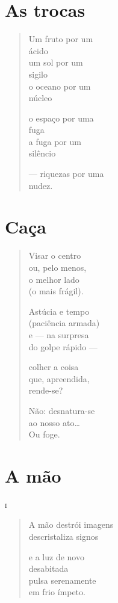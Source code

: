 \chapter{As trocas}

\begin{verse}
Um fruto por um\\
\qquad\qquad\qquad ácido\\
um sol por um\\
\qquad\qquad\qquad sigilo\\
o oceano por um\\
\qquad\qquad\qquad núcleo

o espaço por uma\\
\qquad\qquad\qquad fuga\\
a fuga por um\\
\qquad\qquad\qquad silêncio

--- riquezas por uma\\
\qquad\qquad\qquad nudez.
\end{verse}

\chapter{Caça}

\begin{verse}
Visar o centro\\
ou, pelo menos,\\
o melhor lado\\
(o mais frágil).

Astúcia e tempo\\
(paciência armada)\\
e --- na surpresa\\
do golpe rápido ---

colher a coisa\\
que, apreendida,\\
rende-se?

Não: desnatura-se\\
ao nosso ato\ldots{}\\
Ou foge.
\end{verse}

\chapter{A mão}

\forceindent\textsc{i}

\begin{verse}
A mão destrói imagens\\
descristaliza signos

e a luz de novo\\
desabitada\\
pulsa serenamente\\
em frio ímpeto.
\end{verse}

